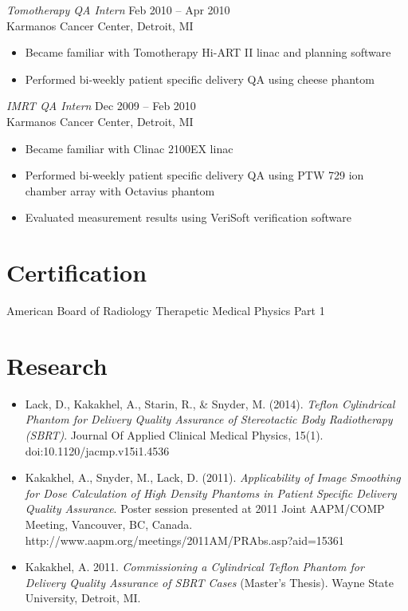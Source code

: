 \documentclass[margin]{res}
\begin{document}
\begin{resume}
{\sl Tomotherapy QA Intern} \hfill         Feb 2010 -- Apr 2010 \\
Karmanos Cancer Center, Detroit, MI
 \begin{itemize}  \itemsep -2pt %
    \item Became familiar with Tomotherapy Hi-ART II linac and planning software
    \item Performed bi-weekly patient specific delivery QA using cheese phantom
 \end{itemize} 
{\sl IMRT QA Intern} \hfill                Dec 2009 -- Feb 2010 \\
Karmanos Cancer Center, Detroit, MI
  \begin{itemize}  \itemsep -2pt %
    \item Became familiar with Clinac 2100EX linac
    \item Performed bi-weekly patient specific delivery QA using PTW 729 ion \\ chamber array with Octavius phantom
    \item Evaluated measurement results using VeriSoft verification software
   \end{itemize} 

\section{Certification} American Board of Radiology Therapetic Medical Physics Part 1

\section{Research}
\begin{itemize} \itemsep -2pt %
    \item Lack, D., Kakakhel, A., Starin, R., \& Snyder, M. (2014). \textit{Teflon Cylindrical Phantom for Delivery Quality Assurance of Stereotactic Body Radiotherapy (SBRT)}. Journal Of Applied Clinical Medical Physics, 15(1). \\ doi:10.1120/jacmp.v15i1.4536
    \item Kakakhel, A., Snyder, M., Lack, D. (2011). \textit{Applicability of Image Smoothing for Dose Calculation of High Density Phantoms in Patient Specific Delivery Quality Assurance}. Poster session presented at 2011 Joint AAPM/COMP Meeting, Vancouver, BC, Canada. \\ http://www.aapm.org/meetings/2011AM/PRAbs.asp?aid=15361
    \item Kakakhel, A. 2011. \textit{Commissioning a Cylindrical Teflon Phantom for Delivery Quality Assurance of SBRT Cases} (Master's Thesis). Wayne State University, Detroit, MI.
\end{itemize}


\end{resume}
\end{document}
